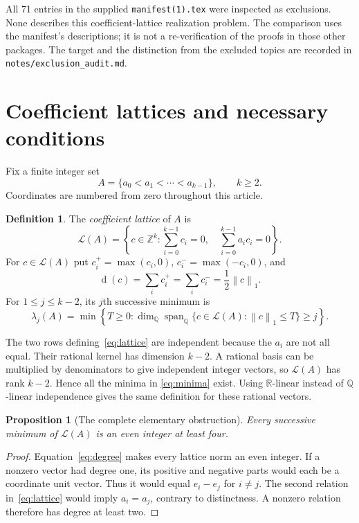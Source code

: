 \documentclass[11pt]{article}
\numberwithin{equation}{section}
\newtheorem{proposition}[theorem]{Proposition}
\theoremstyle{definition}
\newtheorem{definition}[theorem]{Definition}
\theoremstyle{remark}\newtheorem{remark}[theorem]{Remark}
\newcommand{\Z}{\mathbb Z}\newcommand{\N}{\mathbb N}
\newcommand{\Q}{\mathbb Q}\newcommand{\R}{\mathbb R}
\newcommand{\Latt}{\mathcal L}
\newcommand{\dgr}{\operatorname{d}}
\newcommand{\Span}{\operatorname{span}}
\newcommand{\norm}[1]{\left\lVert#1\right\rVert_1}
\begin{document}
All 71 entries in the supplied \texttt{manifest(1).tex} were inspected as
exclusions.  None describes this coefficient-lattice realization problem.
The comparison uses the manifest's descriptions; it is not a re-verification
of the proofs in those other packages.  The target and the distinction from
the excluded topics are recorded in \texttt{notes/exclusion\_audit.md}.

\section{Coefficient lattices and necessary conditions}
\label{sec:necessary}

Fix a finite integer set
\[
 A=\{a_0<a_1<\cdots<a_{k-1}\},\qquad k\ge2.
\]
Coordinates are numbered from zero throughout this article.

\begin{definition}
The \emph{coefficient lattice} of $A$ is
\begin{equation}\label{eq:lattice}
 \Latt(A)=\left\{c\in\Z^k:
     \sum_{i=0}^{k-1}c_i=0,\quad
     \sum_{i=0}^{k-1}a_i c_i=0\right\}.
\end{equation}
For $c\in\Latt(A)$ put $c_i^+=\max(c_i,0)$,
$c_i^-=\max(-c_i,0)$, and
\begin{equation}\label{eq:degree}
 \dgr(c)=\sum_i c_i^+=\sum_i c_i^-=\frac12\norm{c}.
\end{equation}
For $1\le j\le k-2$, its $j$th successive minimum is
\begin{equation}\label{eq:minima}
 \lambda_j(A)=\min\left\{T\ge0:
 \dim_\Q\Span_\Q\{c\in\Latt(A):\norm{c}\le T\}\ge j\right\}.
\end{equation}
\end{definition}
The two rows defining~\eqref{eq:lattice} are independent because the $a_i$
are not all equal.  Their rational kernel has dimension $k-2$.  A rational
basis can be multiplied by denominators to give independent integer
vectors, so $\Latt(A)$ has rank $k-2$.  Hence all the minima in
\eqref{eq:minima} exist.  Using $\R$-linear instead of $\Q$-linear
independence gives the same definition for these rational vectors.

\begin{proposition}[The complete elementary obstruction]
\label{prop:necessary}
Every successive minimum of $\Latt(A)$ is an even integer at least four.
\end{proposition}
\begin{proof}
Equation~\eqref{eq:degree} makes every lattice norm an even integer.  If a
nonzero vector had degree one, its positive and negative parts would each
be a coordinate unit vector.  Thus it would equal $e_i-e_j$ for $i\ne j$.
The second relation in~\eqref{eq:lattice} would imply $a_i=a_j$, contrary
to distinctness.  A nonzero relation therefore has degree at least two.
\end{proof}
\end{document}
